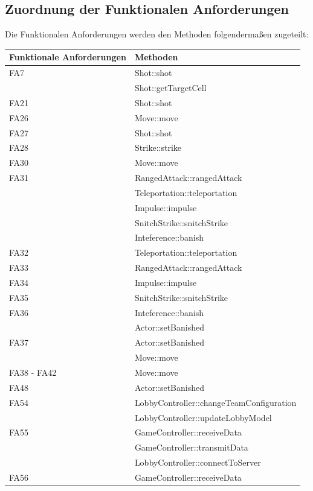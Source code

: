 \subsection{Zuordnung der Funktionalen Anforderungen}
Die Funktionalen Anforderungen werden den Methoden folgendermaßen zugeteilt:
\begin{center}
	\begin{tabular}{|l|l|}
		\hline
		\textbf{Funktionale Anforderungen} & \textbf{Methoden}\\\hline
		FA7 & Shot::shot\\
		& Shot::getTargetCell\\\hline
		FA21 & Shot::shot\\\hline
		FA26 & Move::move\\\hline
		FA27 & Shot::shot\\\hline
		FA28 & Strike::strike\\\hline
		FA30 & Move::move\\\hline
		FA31 & RangedAttack::rangedAttack\\
		& Teleportation::teleportation\\
		& Impulse::impulse\\
		& SnitchStrike::snitchStrike\\
		& Inteference::banish\\\hline
		FA32 & Teleportation::teleportation\\\hline
		FA33 & RangedAttack::rangedAttack\\\hline
		FA34 & Impulse::impulse\\\hline
		FA35 & SnitchStrike::snitchStrike\\\hline
		FA36 & Inteference::banish\\
		& Actor::setBanished\\\hline
		FA37 & Actor::setBanished\\
		& Move::move\\\hline
		FA38 - FA42 & Move::move\\\hline
		FA48 & Actor::setBanished\\\hline
		FA54 & LobbyController::changeTeamConfiguration\\
		& LobbyController::updateLobbyModel\\\hline
		FA55 & GameController::receiveData\\
		& GameController::transmitData\\
		& LobbyController::connectToServer\\\hline
		FA56 & GameController::receiveData\\

\end{tabular}
\end{center}

